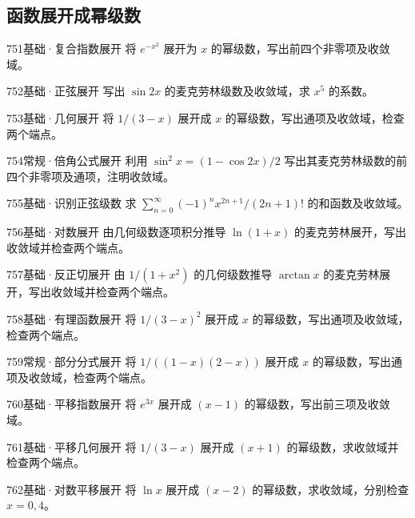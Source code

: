 \subsection{函数展开成幂级数}
\begin{exercise}{751}{基础·复合指数展开}
将 $e^{-x^2}$ 展开为 $x$ 的幂级数，写出前四个非零项及收敛域。
\end{exercise}
\begin{exercise}{752}{基础·正弦展开}
写出 $\sin2x$ 的麦克劳林级数及收敛域，求 $x^5$ 的系数。
\end{exercise}
\begin{exercise}{753}{基础·几何展开}
将 $1/(3-x)$ 展开成 $x$ 的幂级数，写出通项及收敛域，检查两个端点。
\end{exercise}
\begin{exercise}{754}{常规·倍角公式展开}
利用 $\sin^2x=(1-\cos2x)/2$ 写出其麦克劳林级数的前四个非零项及通项，注明收敛域。
\end{exercise}
\begin{exercise}{755}{基础·识别正弦级数}
求 $\sum_{n=0}^{\infty}(-1)^nx^{2n+1}/(2n+1)!$ 的和函数及收敛域。
\end{exercise}
\begin{exercise}{756}{基础·对数展开}
由几何级数逐项积分推导 $\ln(1+x)$ 的麦克劳林展开，写出收敛域并检查两个端点。
\end{exercise}
\begin{exercise}{757}{基础·反正切展开}
由 $1/(1+x^2)$ 的几何级数推导 $\arctan x$ 的麦克劳林展开，写出收敛域并检查两个端点。
\end{exercise}
\begin{exercise}{758}{基础·有理函数展开}
将 $1/(3-x)^2$ 展开成 $x$ 的幂级数，写出通项及收敛域，检查两个端点。
\end{exercise}
\begin{exercise}{759}{常规·部分分式展开}
将 $1/((1-x)(2-x))$ 展开成 $x$ 的幂级数，写出通项及收敛域，检查两个端点。
\end{exercise}
\begin{exercise}{760}{基础·平移指数展开}
将 $e^{3x}$ 展开成 $(x-1)$ 的幂级数，写出前三项及收敛域。
\end{exercise}
\begin{exercise}{761}{基础·平移几何展开}
将 $1/(3-x)$ 展开成 $(x+1)$ 的幂级数，求收敛域并检查两个端点。
\end{exercise}
\begin{exercise}{762}{基础·对数平移展开}
将 $\ln x$ 展开成 $(x-2)$ 的幂级数，求收敛域，分别检查 $x=0,4$。
\end{exercise}
